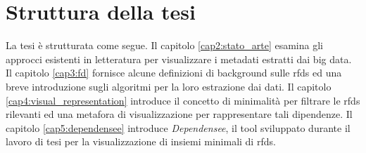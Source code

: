 \section{Struttura della tesi}
La tesi \`{e} strutturata come segue. Il capitolo \ref{cap2:stato_arte} esamina gli approcci esistenti in letteratura per visualizzare i metadati estratti dai big data. Il capitolo \ref{cap3:fd} fornisce alcune definizioni di background sulle \acrfull{rfds} ed una breve introduzione sugli algoritmi per la loro estrazione dai dati. Il capitolo \ref{cap4:visual_representation} introduce il concetto di minimalit\`{a} per filtrare le \acrfull{rfds} rilevanti ed una metafora di visualizzazione per rappresentare tali dipendenze. Il capitolo \ref{cap5:dependensee} introduce \textit{Dependensee}, il tool sviluppato durante il lavoro di tesi per la visualizzazione di insiemi minimali di \acrfull{rfds}.